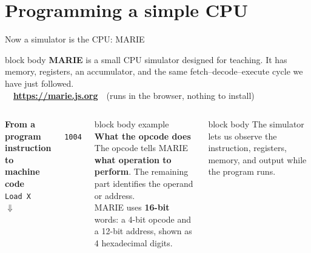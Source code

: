 \documentclass[aspectratio=169,10pt]{beamer}
\begin{document}

\section{Programming a simple CPU}

\begin{frame}{Now a simulator is the CPU: MARIE}
  \begin{beamercolorbox}[rounded=true,sep=0.14cm,wd=\textwidth]{block body}
    \centering\small
    \textbf{MARIE} is a small CPU simulator designed for teaching. It has memory, registers,
    an accumulator, and the same fetch--decode--execute cycle we have just followed.\\[0.05cm]
    \textcolor{DeepBlue}{\faLaptop}\ \ \textbf{\url{https://marie.js.org}}\ \ (runs in the browser, nothing to install)
  \end{beamercolorbox}
  \vspace{0.3cm}
  \begin{columns}[T,onlytextwidth]
      \centering
      \footnotesize\textbf{From a program instruction to machine code}\\[0.12cm]
      \texttt{Load X}\\[0.08cm]
      $\Downarrow$\\[0.08cm]
      \\[0.15cm]
      \texttt{1004}
      \begin{beamercolorbox}[rounded=true,sep=0.13cm,wd=\linewidth]{block body example}
        \small
        \textbf{What the opcode does}\\[0.06cm]
        The opcode tells MARIE \textbf{what operation to perform}. The remaining part identifies the operand or address.\\[0.06cm]
        \footnotesize MARIE uses \textbf{16-bit} words: a 4-bit opcode and a 12-bit address, shown as 4 hexadecimal digits.
      \end{beamercolorbox}
      \vspace{0.1cm}
      \begin{beamercolorbox}[rounded=true,sep=0.13cm,wd=\linewidth]{block body}
        \footnotesize
        The simulator lets us observe the instruction, registers, memory, and output while the program runs.
      \end{beamercolorbox}
  \end{columns}
\end{frame}
\end{document}
